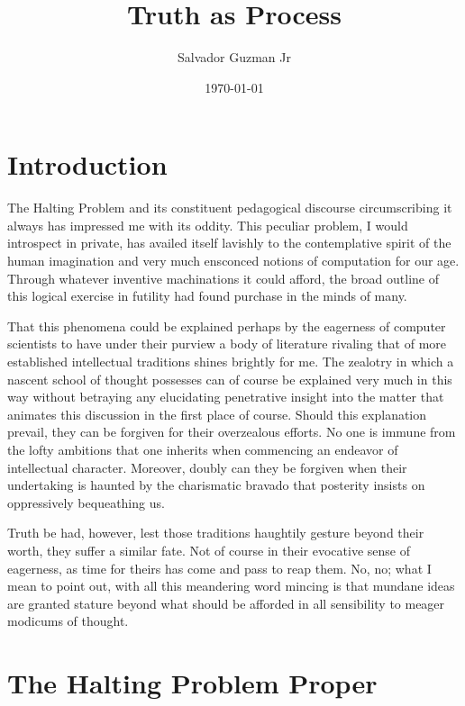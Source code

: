 \documentclass{article}
\begin{document}
	
	\title{Truth as Process}   %
	\author{Salvador Guzman Jr}
	\date{\today}
	\maketitle
	\tableofcontents
	
	\section{Introduction}
	
	The Halting Problem and its constituent pedagogical discourse circumscribing it always has impressed me with its oddity. This peculiar problem, I would introspect in private, has availed itself lavishly to the contemplative spirit of the human imagination and very much ensconced notions of computation for our age. Through whatever inventive machinations it could afford, the broad outline of this logical exercise in futility had found purchase in the minds of many.
	
	That this phenomena could be explained perhaps by the eagerness of computer scientists to have under their purview a body of literature rivaling that of more established intellectual traditions shines brightly for me. The zealotry in which a nascent school of thought possesses can of course be explained very much in this way without betraying any elucidating penetrative insight into the matter that animates this discussion in the first place of course. Should this explanation prevail, they can be forgiven for their overzealous efforts. No one is immune from the lofty ambitions that one inherits when commencing an endeavor of intellectual character. Moreover, doubly can they be forgiven when their undertaking is haunted by the charismatic bravado that posterity insists on oppressively bequeathing us.
	
	Truth be had, however, lest those traditions haughtily gesture beyond their worth, they suffer a similar fate. Not of course in their evocative sense of eagerness, as time for theirs has come and pass to reap them. No, no; what I mean to point out, with all this meandering word mincing is that mundane ideas are granted stature beyond what should be afforded in all sensibility to meager modicums of thought.
	
	\section{The Halting Problem Proper}
	
\end{document}
